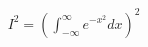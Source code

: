 \documentclass[preview]{standalone}
\begin{document}
\begin{align*}
I^2 = \left(\int_{-\infty}^\infty e^{-x^2} dx\right)^2
\end{align*}
\end{document}
